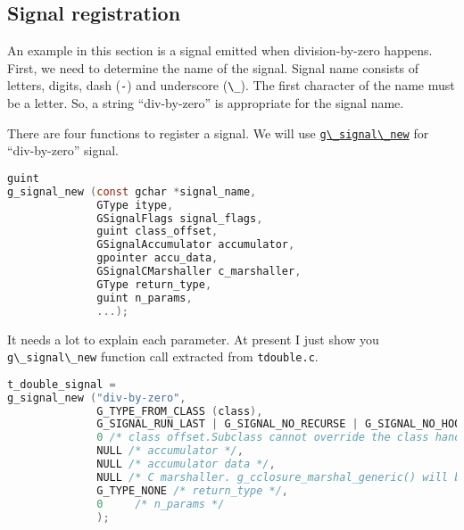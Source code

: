 \subsection{Signal registration}\label{signal-registration}

An example in this section is a signal emitted when division-by-zero
happens. First, we need to determine the name of the signal. Signal name
consists of letters, digits, dash (\passthrough{\lstinline!-!}) and
underscore (\passthrough{\lstinline!\_!}). The first character of the
name must be a letter. So, a string ``div-by-zero'' is appropriate for
the signal name.

There are four functions to register a signal. We will use
\href{https://docs.gtk.org/gobject/func.signal_new.html}{\passthrough{\lstinline!g\_signal\_new!}}
for ``div-by-zero'' signal.

\begin{lstlisting}[language=C]
guint
g_signal_new (const gchar *signal_name,
              GType itype,
              GSignalFlags signal_flags,
              guint class_offset,
              GSignalAccumulator accumulator,
              gpointer accu_data,
              GSignalCMarshaller c_marshaller,
              GType return_type,
              guint n_params,
              ...);
\end{lstlisting}

It needs a lot to explain each parameter. At present I just show you
\passthrough{\lstinline!g\_signal\_new!} function call extracted from
\passthrough{\lstinline!tdouble.c!}.

\begin{lstlisting}[language=C]
t_double_signal =
g_signal_new ("div-by-zero",
              G_TYPE_FROM_CLASS (class),
              G_SIGNAL_RUN_LAST | G_SIGNAL_NO_RECURSE | G_SIGNAL_NO_HOOKS,
              0 /* class offset.Subclass cannot override the class handler (default handler). */,
              NULL /* accumulator */,
              NULL /* accumulator data */,
              NULL /* C marshaller. g_cclosure_marshal_generic() will be used */,
              G_TYPE_NONE /* return_type */,
              0     /* n_params */
              );
\end{lstlisting}

